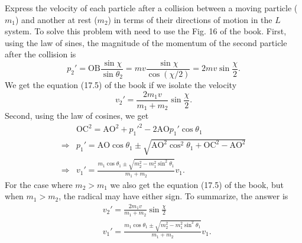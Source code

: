 
\begin{problem}
{
Express the velocity of each particle after a collision between a moving particle ($m_1$) and another at rest ($m_2$) in terms of their directions of motion in the $L$ system.
}
{
To solve this problem with need to use the Fig. 16 of the book. First, using the law of sines, the magnitude of the momentum of the second particle after the collision is
\begin{equation*}
p_2' = \mathrm{OB}\frac{\sin{\chi}}{\sin{\theta_2}} = mv\frac{\sin{\chi}}{\cos{(\chi/2)}} = 2mv\sin{\frac{\chi}{2}}.
\end{equation*}
We get the equation (17.5) of the book if we isolate the velocity
\begin{equation*}
    v_2' = \frac{2m_1v}{m_1+m_2}\sin{\frac{\chi}{2}}.
\end{equation*}
Second, using the law of cosines, we get
\begin{align*}
    &\mathrm{OC}^2 = \mathrm{AO}^2 + p_1'^2 - 2\mathrm{AO}p_1'\cos{\theta_1} \\
    \Rightarrow &p_1' = \mathrm{AO}\cos{\theta_1} \pm \sqrt{\mathrm{AO}^2\cos^2{\theta_1} + \mathrm{OC}^2 - \mathrm{AO}^2} \\
    \Rightarrow &v_1' = \frac{m_1\cos{\theta_1} \pm \sqrt{m_2^2-m_1^2\sin^2{\theta_1}}}{m_1+m_2}v_1.
\end{align*}
For the case where $m_2 > m_1$ we also get the equation (17.5) of the book, but when $m_1 > m_2$, the radical may have either sign. To summarize, the answer is
}
{
\begin{align*}
    &v_2' = \frac{2m_1v}{m_1+m_2}\sin{\frac{\chi}{2}} \\
    &v_1' = \frac{m_1\cos{\theta_1} \pm \sqrt{m_2^2-m_1^2\sin^2{\theta_1}}}{m_1+m_2}v_1.
\end{align*}
}
\end{problem}


